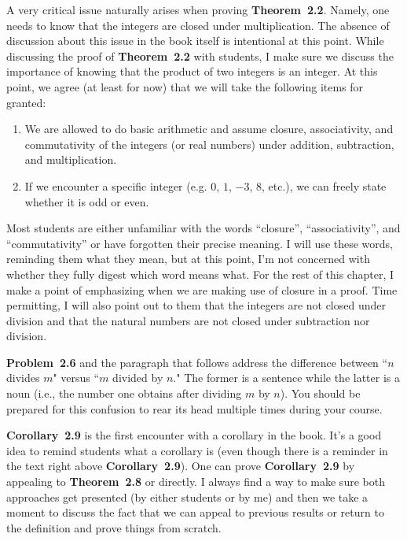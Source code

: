 \documentclass[11pt]{article}%
\newcommand{\blankline}{\pagebreak[2]\vspace{.5\baselineskip}}
\begin{document}
\blankline

A very critical issue naturally arises when proving \textbf{Theorem~2.2}. Namely, one needs to know that the integers are closed under multiplication.  The absence of discussion about this issue in the book itself is intentional at this point.  While discussing the proof of \textbf{Theorem~2.2} with students, I make sure we discuss the importance of knowing that the product of two integers is an integer.  At this point, we agree (at least for now) that we will take the following items for granted:
\begin{enumerate}
\item We are allowed to do basic arithmetic and assume closure, associativity, and commutativity of the integers (or real numbers) under addition, subtraction, and multiplication.
\item If we encounter a specific integer (e.g. $0$, $1$, $-3$, $8$, etc.), we can freely state whether it is odd or even.
\end{enumerate}
Most students are either unfamiliar with the words ``closure'', ``associativity'', and ``commutativity'' or have forgotten their precise meaning. I will use these words, reminding them what they mean, but at this point, I'm not concerned with whether they fully digest which word means what. For the rest of this chapter, I make a point of emphasizing when we are making use of closure in a proof. Time permitting, I will also point out to them that the integers are not closed under division and that the natural numbers are not closed under subtraction nor division.

\blankline

\textbf{Problem~2.6} and the paragraph that follows address the difference between ``$n$ divides $m$" versus ``$m$ divided by $n$."  The former is a sentence while the latter is a noun (i.e., the number one obtains after dividing $m$ by $n$).  You should be prepared for this confusion to rear its head multiple times during your course.

\blankline

\textbf{Corollary~2.9} is the first encounter with a corollary in the book. It's a good idea to remind students what a corollary is (even though there is a reminder in the text right above \textbf{Corollary~2.9}).  One can prove \textbf{Corollary~2.9} by appealing to \textbf{Theorem~2.8} or directly.  I always find a way to make sure both approaches get presented (by either students or by me) and then we take a moment to discuss the fact that we can appeal to previous results or return to the definition and prove things from scratch.
\end{document}
